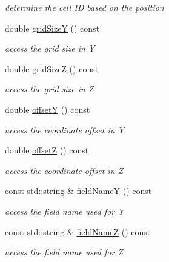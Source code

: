 \begin{DoxyCompactItemize}
\begin{DoxyCompactList}\small\item\em determine the cell ID based on the position \end{DoxyCompactList}\item 
double \hyperlink{class_d_d4hep_1_1_d_d_segmentation_1_1_cartesian_grid_y_z_a067d19fa48e92f2159f033a48a6fe787}{grid\+SizeY} () const
\begin{DoxyCompactList}\small\item\em access the grid size in Y \end{DoxyCompactList}\item 
double \hyperlink{class_d_d4hep_1_1_d_d_segmentation_1_1_cartesian_grid_y_z_a2e79c0363e46beee0014715e6daf7f95}{grid\+SizeZ} () const
\begin{DoxyCompactList}\small\item\em access the grid size in Z \end{DoxyCompactList}\item 
double \hyperlink{class_d_d4hep_1_1_d_d_segmentation_1_1_cartesian_grid_y_z_a45697372b91d1c13ff49549108dadb1d}{offsetY} () const
\begin{DoxyCompactList}\small\item\em access the coordinate offset in Y \end{DoxyCompactList}\item 
double \hyperlink{class_d_d4hep_1_1_d_d_segmentation_1_1_cartesian_grid_y_z_afa4c64608337fc2facae22ece1cdba43}{offsetZ} () const
\begin{DoxyCompactList}\small\item\em access the coordinate offset in Z \end{DoxyCompactList}\item 
const std\+::string \& \hyperlink{class_d_d4hep_1_1_d_d_segmentation_1_1_cartesian_grid_y_z_aafd2965e9e2b3f1ee7b30f504314e00f}{field\+NameY} () const
\begin{DoxyCompactList}\small\item\em access the field name used for Y \end{DoxyCompactList}\item 
const std\+::string \& \hyperlink{class_d_d4hep_1_1_d_d_segmentation_1_1_cartesian_grid_y_z_ae9e7e7d9e27f8dc09cd63ff7606ba092}{field\+NameZ} () const
\begin{DoxyCompactList}\small\item\em access the field name used for Z \end{DoxyCompactList}\item 

\end{DoxyCompactItemize}
